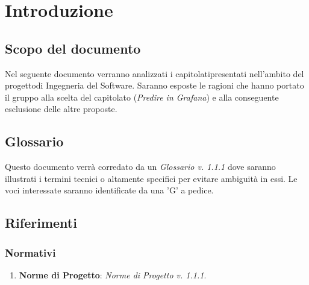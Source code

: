 \section{Introduzione}
\subsection{Scopo del documento}
    Nel seguente documento verranno analizzati i capitolati\glosp presentati nell'ambito del progetto\glosp di Ingegneria del Software. Saranno esposte le ragioni che hanno portato il gruppo alla scelta del capitolato (\textit{Predire in Grafana}\glo) e alla conseguente esclusione delle altre proposte.
\subsection{Glossario}
    Questo documento verrà corredato da un \textit{Glossario v. 1.1.1} dove saranno illustrati i termini tecnici o altamente specifici per evitare ambiguità in essi. Le voci interessate saranno identificate da una 'G' a pedice.
\subsection{Riferimenti}
\subsubsection{Normativi}
\begin{enumerate}
	\item \textbf{Norme di Progetto}: \textit{Norme di Progetto v. 1.1.1}.
\end{enumerate}
